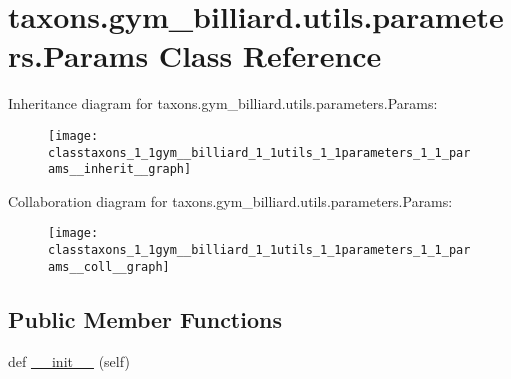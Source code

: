 \hypertarget{classtaxons_1_1gym__billiard_1_1utils_1_1parameters_1_1_params}{}\section{taxons.\+gym\+\_\+billiard.\+utils.\+parameters.\+Params Class Reference}
\label{classtaxons_1_1gym__billiard_1_1utils_1_1parameters_1_1_params}


Inheritance diagram for taxons.\+gym\+\_\+billiard.\+utils.\+parameters.\+Params\+:
\nopagebreak
\begin{figure}[H]
\begin{center}
\leavevmode
\texttt{[image: classtaxons\_1\_1gym\_\_billiard\_1\_1utils\_1\_1parameters\_1\_1\_params\_\_inherit\_\_graph]}
\end{center}
\end{figure}


Collaboration diagram for taxons.\+gym\+\_\+billiard.\+utils.\+parameters.\+Params\+:
\nopagebreak
\begin{figure}[H]
\begin{center}
\leavevmode
\texttt{[image: classtaxons\_1\_1gym\_\_billiard\_1\_1utils\_1\_1parameters\_1\_1\_params\_\_coll\_\_graph]}
\end{center}
\end{figure}
\subsection*{Public Member Functions}
\begin{DoxyCompactItemize}
\item 
def \hyperlink{classtaxons_1_1gym__billiard_1_1utils_1_1parameters_1_1_params_afa420a97816bf42851a4b9be6f9205e8}{\+\_\+\+\_\+init\+\_\+\+\_\+} (self)
\end{DoxyCompactItemize}
